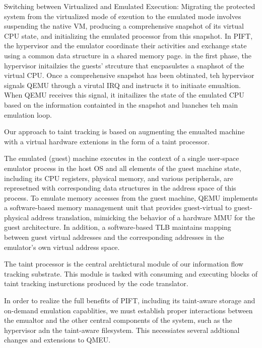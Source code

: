 Switching between Virtualized and Emulated Execution: Migrating the protected
system from the virtualized mode of exeution to the emulated mode involves
suspending the native VM, producing a comprehensive snapshot of its virtual CPU
state, and initializing the emulated processor from this snapshot.  In PIFT,
the
hypervisor and the emulator coordinate their activities and exchange state using
a common data structure in a shared memory page.  in the first phase, the
hypervisor initailzies the guests' strcuture that encpasulstes a snaphsot of
the virtual CPU.  Once a comprehensive snapshot has been obtinated, teh
hypervisor signals QEMU through a virutal IRQ and instructs it to initiaate
emualtion.  When QEMU receives this signal, it initailizes the state of the
emulated CPU based on the information containted in the snapshot and luanches
teh main emulation loop.


Our approach to taint tracking is based on augmenting the emualted machine with
a virtual hardware extenions in the form of a taint processor.

The emulated (guest) machine executes in the context of a single user-space
emulator process in the host OS and all elements of the guest machine state,
including its CPU registers, physical memory, and various peripherals,
are represetned with corresponding data structures in the address
space of this process.  To emulate memory accesses from the guest machine, QEMU
implements a software-based memory management unit that provides guest-virtual
to guest-physical address translation, mimicking the behavior of a hardware MMU
for the guest architecture.  In addition, a software-based TLB maintains
mapping between guest virtual addresses and the corresponding addresses in the
emulator's own virtual address space.

The taint processor is the central arehtictural module of our information
flow tracking substrate.  This module is tasked with consuming and executing
blocks of taint tracking insturctions produced by the code translator.


In order to realize the full benefits of PIFT, including its taint-aware
storage and on-demand emulation capablities, we must establish proper
interactions between the emualtor and the other central components of the
system, such as the hypervisor adn the taint-aware filesystem.  This
necessiates several addtional changes and extensions to QMEU.

